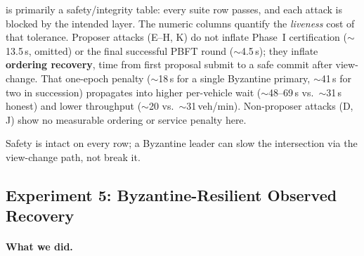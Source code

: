 \documentclass[letterpaper,10pt,conference]{IEEEtran}
\begin{document}
 is primarily a safety/integrity table: every suite row passes, and each attack is blocked by the intended layer. The numeric columns quantify the \emph{liveness} cost of that tolerance. Proposer attacks (E--H, K) do not inflate Phase~I certification ($\sim$13.5\,s, omitted) or the final successful PBFT round ($\sim$4.5\,s); they inflate \textbf{ordering recovery}, time from first proposal submit to a safe commit after view-change. That one-epoch penalty ($\sim$18\,s for a single Byzantine primary, $\sim$41\,s for two in succession) propagates into higher per-vehicle wait ($\sim$48--69\,s vs.\ $\sim$31\,s honest) and lower throughput ($\sim$20 vs.\ $\sim$31\,veh/min). Non-proposer attacks (D, J) show no measurable ordering or service penalty here. 

Safety is intact on every row; a Byzantine leader can slow the intersection via the view-change path, not break it.



%
%
%
%
%


\subsection{Experiment 5: Byzantine-Resilient Observed Recovery}
\label{sec:eval-recovery}

%
%
%
\paragraph{What we did.}

%
%
\end{document}
